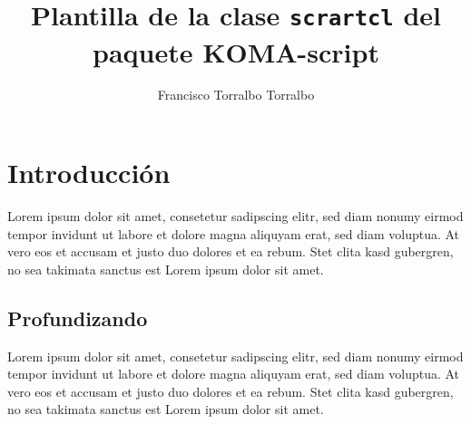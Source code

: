 \documentclass{scrartcl}
\title{Plantilla de la clase \texttt{scrartcl} del paquete KOMA-script}
\author{Francisco Torralbo Torralbo}
\begin{document}
\maketitle

\section{Introducción}
Lorem ipsum dolor sit amet, consetetur sadipscing elitr, sed diam nonumy eirmod
tempor invidunt ut labore et dolore magna aliquyam erat, sed diam voluptua. At
vero eos et accusam et justo duo dolores et ea rebum. Stet clita kasd gubergren,
no sea takimata sanctus est Lorem ipsum dolor sit amet. 

\subsection{Profundizando}
Lorem ipsum dolor sit amet, consetetur sadipscing elitr, sed diam nonumy eirmod
tempor invidunt ut labore et dolore magna aliquyam erat, sed diam voluptua. At
vero eos et accusam et justo duo dolores et ea rebum. Stet clita kasd gubergren,
no sea takimata sanctus est Lorem ipsum dolor sit amet.
\end{document}
